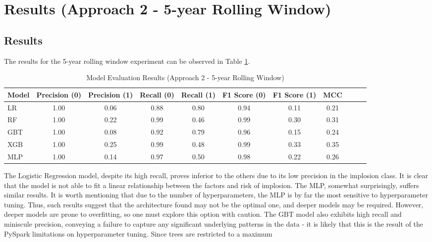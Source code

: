 \documentclass[a4paper]{report}
\begin{document}
\section{Results (Approach 2 - 5-year Rolling Window)}

\subsection{Results}
The results for the 5-year rolling window experiment can be observed in Table \ref{tab:model_evaluation_all}.
\begin{table}[htbp]
  \centering
  \caption{Model Evaluation Results (Approach 2 - 5-year Rolling Window)}
  \label{tab:model_evaluation_all}
  \begin{adjustbox}{max width=\textwidth}
  \begin{tabular}{lcccccccccc}
    \toprule
    Model & Precision (0) & Precision (1) & Recall (0) & Recall (1) & F1 Score (0) & F1 Score (1) & MCC\\
    \midrule
    LR & 1.00 & 0.06 & 0.88 & 0.80 & 0.94 & 0.11 & 0.21  \\
    RF & 1.00 & 0.22 & 0.99 & 0.46 & 0.99 & 0.30 & 0.31  \\
    GBT & 1.00 & 0.08 & 0.92 & 0.79 & 0.96 & 0.15 & 0.24 \\
    XGB & 1.00 & 0.25 & 0.99 & 0.48 & 0.99 & 0.33 & 0.35 \\
    MLP & 1.00 & 0.14 & 0.97 & 0.50 & 0.98 & 0.22 & 0.26  \\
    \bottomrule
  \end{tabular}
  \end{adjustbox}
\end{table}The Logistic Regression model, despite its high recall, proves inferior to the others due to its low precision in the implosion class. It is clear that the model is not able to fit a linear relationship between the factors 
and risk of implosion. The MLP, somewhat surprisingly, suffers similar results. It is worth mentioning that due to the number of hyperparameters, the MLP is by far the most 
sensitive to hyperparameter tuning. Thus, such results suggest that the architecture found may not be the optimal one, and deeper models may be required. However, deeper models 
are prone to overfitting, so one must explore this option with caution. The GBT model also exhibits high recall and miniscule precision, conveying a failure to capture 
any significant underlying patterns in the data - it is likely that this is the result of the PySpark limitations on hyperparameter tuning. Since trees are restricted to a maximum 
\end{document}

